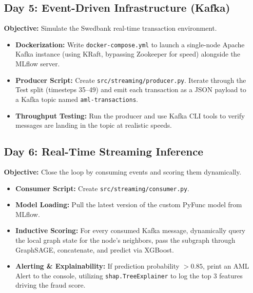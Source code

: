 \documentclass[12pt,a4paper]{article}
\newcommand{\todo}{\ding{113}}
\begin{document}
\subsection{Day 5: Event-Driven Infrastructure (Kafka)}
\textbf{Objective:} Simulate the Swedbank real-time transaction environment.

\begin{itemize}
    \item[\todo] \textbf{Dockerization:} Write \texttt{docker-compose.yml} to launch a single-node Apache Kafka instance (using KRaft, bypassing Zookeeper for speed) alongside the MLflow server.
    \item[\todo] \textbf{Producer Script:} Create \texttt{src/streaming/producer.py}. Iterate through the Test split (timesteps 35--49) and emit each transaction as a JSON payload to a Kafka topic named \texttt{aml-transactions}.
    \item[\todo] \textbf{Throughput Testing:} Run the producer and use Kafka CLI tools to verify messages are landing in the topic at realistic speeds.
\end{itemize}

\subsection{Day 6: Real-Time Streaming Inference}
\textbf{Objective:} Close the loop by consuming events and scoring them dynamically.

\begin{itemize}
    \item[\todo] \textbf{Consumer Script:} Create \texttt{src/streaming/consumer.py}.
    \item[\todo] \textbf{Model Loading:} Pull the latest version of the custom PyFunc model from MLflow.
    \item[\todo] \textbf{Inductive Scoring:} For every consumed Kafka message, dynamically query the local graph state for the node's neighbors, pass the subgraph through GraphSAGE, concatenate, and predict via XGBoost.
    \item[\todo] \textbf{Alerting \& Explainability:} If prediction probability $> 0.85$, print an AML Alert to the console, utilizing \texttt{shap.TreeExplainer} to log the top 3 features driving the fraud score.
\end{itemize}

\end{document}
